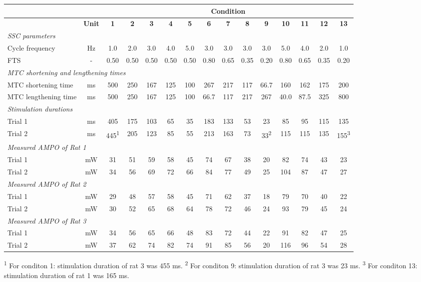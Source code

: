 \begin{tabular}{|l|c|c|c|c|c|c|c|c|c|c|c|c|c|c|} \hline
  & & \multicolumn{13}{c|}{Condition}  \\ \hline
  \bfseries & \bfseries Unit & \bfseries 1 & \bfseries 2 & \bfseries 3 & \bfseries 4 & \bfseries 5 & \bfseries 6 & \bfseries 7 & \bfseries 8 & \bfseries 9 & \bfseries 10 & \bfseries 11 & \bfseries 12 & \bfseries 13 \\ \hline
  \multicolumn{15}{|l|}{\itshape SSC parameters} \\ \hline
Cycle frequency & Hz & 1.0 & 2.0 & 3.0 & 4.0 & 5.0 & 3.0 & 3.0 & 3.0 & 3.0 & 5.0 & 4.0 & 2.0 & 1.0 \\ \hline
FTS & - & 0.50 & 0.50 & 0.50 & 0.50 & 0.50 & 0.80 & 0.65 & 0.35 & 0.20 & 0.80 & 0.65 & 0.35 & 0.20 \\ \hline
  \multicolumn{15}{|l|}{\itshape MTC shortening and lengthening times} \\ \hline
MTC shortening time & ms & 500 & 250 & 167 & 125 & 100 & 267 & 217 & 117 & 66.7 & 160 & 162 & 175 & 200 \\ \hline
MTC lengthening time & ms & 500 & 250 & 167 & 125 & 100 & 66.7 & 117 & 217 & 267 & 40.0 & 87.5 & 325 & 800 \\ \hline
  \multicolumn{15}{|l|}{\itshape Stimulation durations} \\ \hline
Trial 1 & ms & 405 & 175 & 103 & 65 & 35 & 183 & 133 & 53 & 23 & 85 & 95 & 115 & 135 \\ \hline
Trial 2 & ms & 445\textsuperscript{1} & 205 & 123 & 85 & 55 & 213 & 163 & 73 & 33\textsuperscript{2} & 115 & 115 & 135 & 155\textsuperscript{3} \\ \hline
  \multicolumn{15}{|l|}{\itshape Measured AMPO of Rat 1} \\ \hline
 Trial 1  & mW  & 31  & 51  & 59  & 58  & 45  & 74  & 67  & 38  & 20  & 82  & 74  & 43  & 23 \\ \hline 
 Trial 2  & mW  & 34  & 56  & 69  & 72  & 66  & 84  & 77  & 49  & 25  & 104  & 87  & 47  & 27 \\ \hline 
  \multicolumn{15}{|l|}{\itshape Measured AMPO of Rat 2} \\ \hline
 Trial 1  & mW  & 29  & 48  & 57  & 58  & 45  & 71  & 62  & 37  & 18  & 79  & 70  & 40  & 22 \\ \hline 
 Trial 2  & mW  & 30  & 52  & 65  & 68  & 64  & 78  & 72  & 46  & 24  & 93  & 79  & 45  & 24 \\ \hline 
  \multicolumn{15}{|l|}{\itshape Measured AMPO of Rat 3} \\ \hline
 Trial 1  & mW  & 34  & 56  & 65  & 66  & 48  & 83  & 72  & 44  & 22  & 91  & 82  & 47  & 25 \\ \hline 
 Trial 2  & mW  & 37  & 62  & 74  & 82  & 74  & 91  & 85  & 56  & 20  & 116  & 96  & 54  & 28 \\ \hline 
\end{tabular}\break\hfill\footnotesize{\textsuperscript{1} For conditon 1: stimulation duration of rat 3 was 455 ms. \textsuperscript{2} For conditon 9: stimulation duration of rat 3 was 23 ms. \textsuperscript{3} For conditon 13: stimulation duration of rat 1 was 165 ms.}